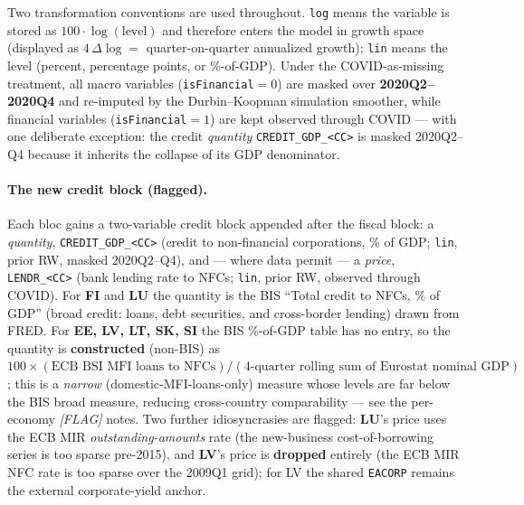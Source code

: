 Two transformation conventions are used throughout.  \texttt{log} means
the variable is stored as $100\cdot\log(\text{level})$ and therefore
enters the model in growth space (displayed as $4\,\Delta\log=$
quarter-on-quarter annualized growth); \texttt{lin} means the level
(percent, percentage points, or \%-of-GDP).  Under the COVID-as-missing
treatment, all macro variables (\texttt{isFinancial}$=0$) are masked over
\textbf{2020Q2--2020Q4} and re-imputed by the Durbin--Koopman simulation
smoother, while financial variables (\texttt{isFinancial}$=1$) are kept
observed through COVID --- with one deliberate exception: the credit
\emph{quantity} \texttt{CREDIT\_GDP\_<CC>} is masked 2020Q2--Q4 because it
inherits the collapse of its GDP denominator.

\paragraph{The new credit block (flagged).}
Each bloc gains a two-variable credit block appended after the fiscal
block: a \emph{quantity}, \texttt{CREDIT\_GDP\_<CC>} (credit to
non-financial corporations, \% of GDP; \texttt{lin}, prior RW, masked
2020Q2--Q4), and --- where data permit --- a \emph{price},
\texttt{LENDR\_<CC>} (bank lending rate to NFCs; \texttt{lin}, prior RW,
observed through COVID).  For \textbf{FI} and \textbf{LU} the quantity is
the BIS ``Total credit to NFCs, \% of GDP'' (broad credit: loans, debt
securities, and cross-border lending) drawn from FRED.  For
\textbf{EE, LV, LT, SK, SI} the BIS \%-of-GDP table has no entry, so the
quantity is \textbf{constructed} (non-BIS) as
$100\times(\text{ECB BSI MFI loans to NFCs})/(\text{4-quarter rolling sum of Eurostat nominal GDP})$;
this is a \emph{narrow} (domestic-MFI-loans-only) measure whose levels are
far below the BIS broad measure, reducing cross-country comparability ---
see the per-economy \textit{[FLAG]} notes.  Two further idiosyncrasies are
flagged: \textbf{LU}'s price uses the ECB MIR \emph{outstanding-amounts}
rate (the new-business cost-of-borrowing series is too sparse pre-2015),
and \textbf{LV}'s price is \textbf{dropped} entirely (the ECB MIR NFC rate
is too sparse over the 2009Q1 grid); for LV the shared \texttt{EACORP}
remains the external corporate-yield anchor.


